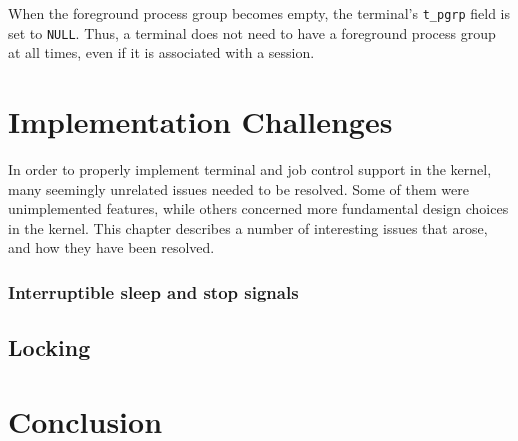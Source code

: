\documentclass[shortabstract, manyadvisors, english, mgr]{iithesis}
\begin{document}
When the foreground process group becomes empty, the terminal's \texttt{t\_pgrp}
field is set to \texttt{NULL}. Thus, a terminal does not need to have a
foreground process group at all times, even if it is associated with a session.

\chapter{Implementation Challenges}

In order to properly implement terminal and job control support in the kernel,
many seemingly unrelated issues needed to be resolved. Some of them were
unimplemented features, while others concerned more fundamental design choices
in the kernel. This chapter describes a number of interesting issues that arose,
and how they have been resolved.

\subsection{Interruptible sleep and stop signals}
\section{Locking}
\chapter{Conclusion}



\end{document}
